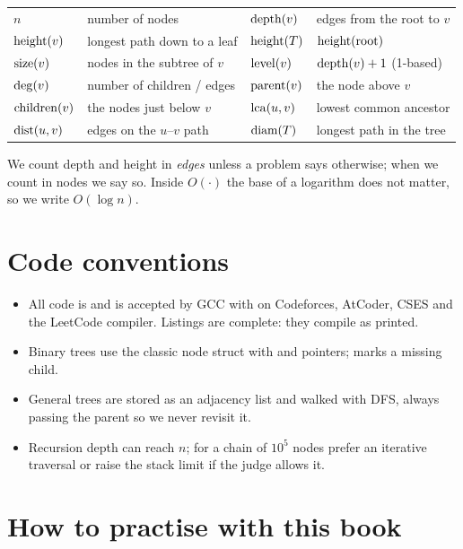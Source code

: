 \begin{center}
\begin{tabular}{@{}ll@{\qquad}ll@{}}
\toprule
$n$ & number of nodes & $\operatorname{depth}(v)$ & edges from the root to $v$ \\
$\operatorname{height}(v)$ & longest path down to a leaf & $\operatorname{height}(T)$ & $\operatorname{height}(\text{root})$ \\
$\operatorname{size}(v)$ & nodes in the subtree of $v$ & $\operatorname{level}(v)$ & $\operatorname{depth}(v)+1$ (1-based) \\
$\operatorname{deg}(v)$ & number of children / edges & $\operatorname{parent}(v)$ & the node above $v$ \\
$\operatorname{children}(v)$ & the nodes just below $v$ & $\operatorname{lca}(u,v)$ & lowest common ancestor \\
$\operatorname{dist}(u,v)$ & edges on the $u$--$v$ path & $\operatorname{diam}(T)$ & longest path in the tree \\
\bottomrule
\end{tabular}
\end{center}

We count depth and height in \emph{edges} unless a problem says otherwise;
when we count in nodes we say so. Inside $O(\cdot)$ the base of a logarithm
does not matter, so we write $O(\log n)$.

\section*{Code conventions}

\begin{itemize}
  \item All code is \cpp{} and is accepted by GCC with  on
        Codeforces, AtCoder, CSES and the LeetCode compiler. Listings are
        complete: they compile as printed.
  \item Binary trees use the classic node struct with  and
         pointers; \nil{} marks a missing child.
  \item General trees are stored as an adjacency list
         and walked with DFS, always passing the
        parent so we never revisit it.
  \item Recursion depth can reach $n$; for a chain of $10^5$ nodes prefer an
        iterative traversal or raise the stack limit if the judge allows it.
\end{itemize}

\section*{How to practise with this book}

